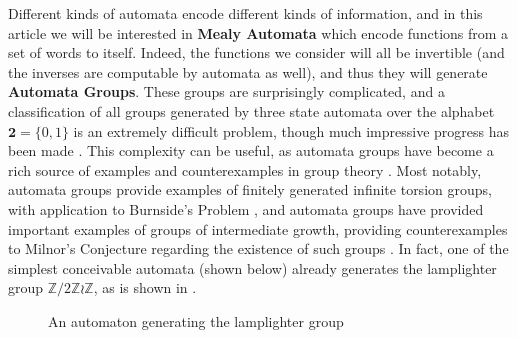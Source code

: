\documentclass[final]{ws-ijac}
\newcommand{\Z}{\mathbb{Z}}
\newcommand{\2}{\textbf{2}}
\begin{document}
Different kinds of automata encode different kinds of information, and
in this article we will be interested in \textbf{Mealy Automata} which encode
functions from a set of words to itself. Indeed, the functions we consider
will all be invertible (and the inverses are computable by automata as well),
and thus they will generate \textbf{Automata Groups}.
These groups are surprisingly complicated, and a classification of all groups 
generated by three state automata over the alphabet $\2 = \{0,1\}$ is an 
extremely difficult problem, though much impressive progress has been 
made \cite{Bondarenko09:three_state}. This complexity can be useful, 
as automata groups have become a rich source of examples and counterexamples
in group theory
\cite{Nekrashevych05:self_similar_groups%
     ,Sidki00:one_rooted_trees%
     ,GrigorchukNS00:automata_groups%
     }. 
Most notably, automata groups provide examples of finitely generated 
infinite torsion groups, with application to 
Burnside's Problem \cite{Grigorchuk1980, Gupta83:burnside}, and automata groups 
have provided important examples of groups of intermediate growth, providing 
counterexamples to Milnor's Conjecture regarding the existence of such groups
\cite{Grigorchuk11:Milnor}. In fact, one of the simplest conceivable automata 
(shown below) already generates the lamplighter group $\Z/2\Z \wr \Z$, as
is shown in \cite{GrigorchukZuk01:lamplighter}.

\begin{figure}
\begin{center}
\end{center}

\caption{An automaton generating the lamplighter group}
\label{fig:1}
\end{figure}
\end{document}
